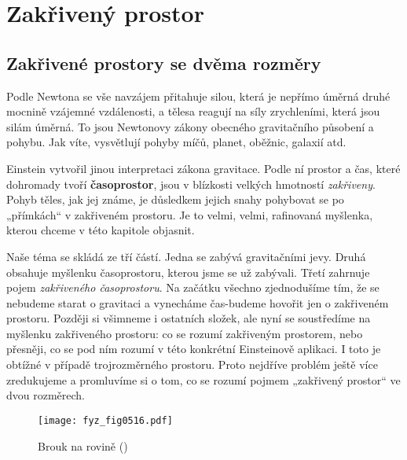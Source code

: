 \setchaptertoc
\chapter{Zakřivený prostor}\label{fyz:IIchapXLII}
  \section{Zakřivené prostory se dvěma rozměry}\label{fyz:IIchapXLIIsecI}
    Podle Newtona se vše navzájem přitahuje silou, která je nepřímo úměrná druhé mocnině vzájemné 
    vzdálenosti, a tělesa reagují na síly zrychleními, která jsou silám úměrná. To jsou Newtonovy 
    zákony obecného gravitačního působení a pohybu. Jak víte, vysvětlují pohyby míčů, planet, 
    oběžnic, galaxií atd.
    
    Einstein vytvořil jinou interpretaci zákona gravitace. Podle ní prostor a čas, které dohromady 
    tvoří \textbf{časoprostor}, jsou v blízkosti velkých hmotností \emph{zakřiveny}. Pohyb těles, 
    jak jej známe, je důsledkem jejich snahy pohybovat se po „přímkách“ v zakřiveném prostoru. Je 
    to velmi, velmi, rafinovaná myšlenka, kterou chceme v této kapitole objasnit.
    
    Naše téma se skládá ze tří částí. Jedna se zabývá gravitačními jevy. Druhá obsahuje myšlenku 
    časoprostoru, kterou jsme se už zabývali. Třetí zahrnuje pojem \emph{zakřiveného časoprostoru}. 
    Na začátku všechno zjednodušíme tím, že se nebudeme starat o gravitaci a vynecháme čas-budeme 
    hovořit jen o zakřiveném prostoru. Později si všimneme i ostatních složek, ale nyní se 
    soustředíme na myšlenku zakřiveného prostoru: co se rozumí zakřiveným prostorem, nebo přesněji, 
    co se pod ním rozumí v této konkrétní Einsteinově aplikaci. I toto je obtížné v případě 
    trojrozměrného prostoru. Proto nejdříve problém ještě více zredukujeme a promluvíme si o tom, 
    co se rozumí pojmem „zakřivený prostor“ ve dvou rozměrech.

    \begin{figure}[ht!] %
      \centering
      \texttt{[image: fyz\_fig0516.pdf]}
      \caption{Brouk na rovině (\cite[s.~775]{Feynman02})}
      \label{fyz:fig0516}
    \end{figure}
    
